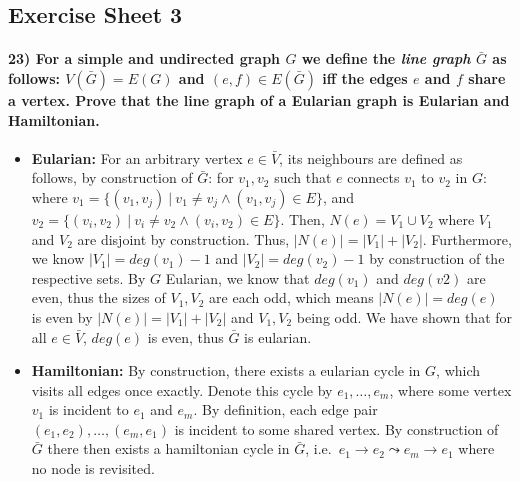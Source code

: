 \documentclass[
]{article}
\providecommand{\tightlist}{%
  \setlength{\itemsep}{0pt}\setlength{\parskip}{0pt}}
\begin{document}
\hypertarget{exercise-sheet-3}{%
\subsection{Exercise Sheet 3}\label{exercise-sheet-3}}

\hypertarget{for-a-simple-and-undirected-graph-g-we-define-the-line-graph-bar-g-as-follows-vbar-g-eg-and-ef-in-ebar-g-iff-the-edges-e-and-f-share-a-vertex.-prove-that-the-line-graph-of-a-eularian-graph-is-eularian-and-hamiltonian.}{%
\paragraph{\texorpdfstring{23) For a simple and undirected graph \(G\)
we define the \emph{line graph} \(\bar G\) as follows:
\(V(\bar G) = E(G)\) and \((e,f) \in E(\bar G)\) iff the edges \(e\) and
\(f\) share a vertex. Prove that the line graph of a Eularian graph is
Eularian and
Hamiltonian.}{23) For a simple and undirected graph G we define the line graph \textbackslash bar G as follows: V(\textbackslash bar G) = E(G) and (e,f) \textbackslash in E(\textbackslash bar G) iff the edges e and f share a vertex. Prove that the line graph of a Eularian graph is Eularian and Hamiltonian.}}\label{for-a-simple-and-undirected-graph-g-we-define-the-line-graph-bar-g-as-follows-vbar-g-eg-and-ef-in-ebar-g-iff-the-edges-e-and-f-share-a-vertex.-prove-that-the-line-graph-of-a-eularian-graph-is-eularian-and-hamiltonian.}}

\begin{itemize}
\tightlist
\item
  \textbf{Eularian:} For an arbitrary vertex \(e \in \bar V\), its
  neighbours are defined as follows, by construction of \(\bar G\): for
  \(v_1, v_2\) such that \(e\) connects \(v_1\) to \(v_2\) in \(G\):
  where
  \(v_1 = \{(v_1,v_j) \ | \ v_1 \neq v_j \land (v_1,v_j) \in E\}\), and
  \(v_2 = \{(v_i,v_2) \ | \ v_i \neq v_2 \land (v_i,v_2) \in E\}\).
  Then, \(N(e) = V_1 \cup V_2\) where \(V_1\) and \(V_2\) are disjoint
  by construction. Thus, \(|N(e)| = |V_1| + |V_2|\). Furthermore, we
  know \(|V_1| = deg(v_1)-1\) and \(|V_2| = deg(v_2)-1\) by construction
  of the respective sets. By \(G\) Eularian, we know that \(deg(v_1)\)
  and \(deg(v2)\) are even, thus the sizes of \(V_1,V_2\) are each odd,
  which means \(|N(e)| = deg(e)\) is even by \(|N(e)| = |V_1| + |V_2|\)
  and \(V_1,V_2\) being odd. We have shown that for all
  \(e \in \bar V\), \(deg(e)\) is even, thus \(\bar G\) is eularian.
\item
  \textbf{Hamiltonian:} By construction, there exists a eularian cycle
  in \(G\), which visits all edges once exactly. Denote this cycle by
  \(e_1, \dots, e_m\), where some vertex \(v_1\) is incident to \(e_1\)
  and \(e_m\). By definition, each edge pair
  \((e_1,e_2), \dots, (e_m,e_1)\) is incident to some shared vertex. By
  construction of \(\bar G\) there then exists a hamiltonian cycle in
  \(\bar G\), i.e.~\(e_1 \rightarrow e_2 \leadsto e_m \rightarrow e_1\)
  where no node is revisited.
\end{itemize}
\end{document}
